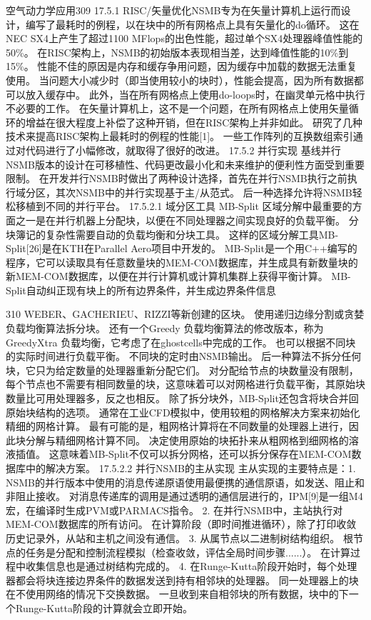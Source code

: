 \documentclass[UTF8,11pt,a4paper,openany,fontset=fandol]{ctexbook}
\begin{document}
空气动力学应用309 17.5.1 RISC/矢量优化NSMB专为在矢量计算机上运行而设计，编写了最耗时的例程，以在块中的所有网格点上具有矢量化的do循环。 这在NEC SX4上产生了超过1100 MFlops的出色性能，超过单个SX4处理器峰值性能的50\%。 在RISC架构上，NSMB的初始版本表现相当差，达到峰值性能的10\%到15\%。 性能不佳的原因是内存和缓存争用问题，因为缓存中加载的数据无法重复使用。 当问题大小减少时（即当使用较小的块时），性能会提高，因为所有数据都可以放入缓存中。 此外，当在所有网格点上使用do-loops时，在幽灵单元格中执行不必要的工作。 在矢量计算机上，这不是一个问题，在所有网格点上使用矢量循环的增益在很大程度上补偿了这种开销，但在RISC架构上并非如此。 研究了几种技术来提高RISC架构上最耗时的例程的性能[1]。 一些工作阵列的互换数组索引通过对代码进行了小幅修改，就取得了很好的改进。 17.5.2 并行实现 基线并行NSMB版本的设计在可移植性、代码更改最小化和未来维护的便利性方面受到重要限制。 在开发并行NSMB时做出了两种设计选择，首先在并行NSMB执行之前执行域分区，其次NSMB中的并行实现基于主/从范式。 后一种选择允许将NSMB轻松移植到不同的并行平台。 17.5.2.1 域分区工具 MB-Split 区域分解中最重要的方面之一是在并行机器上分配块，以便在不同处理器之间实现良好的负载平衡。 分块簿记的复杂性需要自动的负载均衡和分块工具。 这样的区域分解工具MB-Split[26]是在KTH在Parallel Aero项目中开发的。 MB-Split是一个用C++编写的程序，它可以读取具有任意数量块的MEM-COM数据库，并生成具有新数量块的新MEM-COM数据库，以便在并行计算机或计算机集群上获得平衡计算。 MB-Split自动纠正现有块上的所有边界条件，并生成边界条件信息

310 WEBER、GACHERIEU、RIZZI等新创建的区块。 使用递归边缘分割或贪婪负载均衡算法拆分块。 还有一个Greedy 负载均衡算法的修改版本，称为GreedyXtra 负载均衡，它考虑了在ghostcells中完成的工作。 也可以根据不同块的实际时间进行负载平衡。 不同块的定时由NSMB输出。 后一种算法不拆分任何块，它只为给定数量的处理器重新分配它们。 对分配给节点的块数量没有限制，每个节点也不需要有相同数量的块，这意味着可以对网格进行负载平衡，其原始块数量比可用处理器多，反之也相反。 除了拆分块外，MB-Split还包含将块合并回原始块结构的选项。 通常在工业CFD模拟中，使用较粗的网格解决方案来初始化精细的网格计算。 最有可能的是，粗网格计算将在不同数量的处理器上进行，因此块分解与精细网格计算不同。 决定使用原始的块拓扑来从粗网格到细网格的溶液插值。 这意味着MB-Split不仅可以拆分网格，还可以拆分保存在MEM-COM数据库中的解决方案。 17.5.2.2 并行NSMB的主从实现 主从实现的主要特点是：1. NSMB的并行版本中使用的消息传递原语使用最便携的通信原语，如发送、阻止和非阻止接收。 对消息传递库的调用是通过透明的通信层进行的，IPM[9]是一组M4宏，在编译时生成PVM或PARMACS指令。 2. 在并行NSMB中，主站执行对MEM-COM数据库的所有访问。 在计算阶段（即时间推进循环），除了打印收敛历史记录外，从站和主机之间没有通信。 3. 从属节点以二进制树结构组织。 根节点的任务是分配和控制流程模拟（检查收敛，评估全局时间步骤......）。 在计算过程中收集信息也是通过树结构完成的。 4. 在Runge-Kutta阶段开始时，每个处理器都会将块连接边界条件的数据发送到持有相邻块的处理器。 同一处理器上的块在不使用网络的情况下交换数据。 一旦收到来自相邻块的所有数据，块中的下一个Runge-Kutta阶段的计算就会立即开始。
\end{document}
